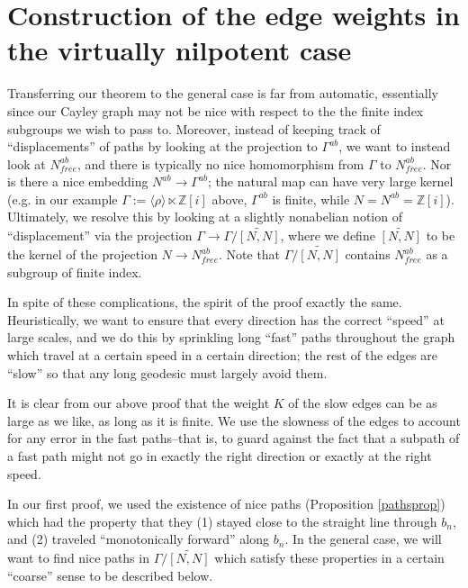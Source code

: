 \documentclass[12pt,reqno]{article}
\numberwithin{equation}{section}
\newcommand{\Z}{\mathbb{Z}}
\begin{document}
\section{Construction of the edge weights in the virtually nilpotent case} \label{generalconstruction}

Transferring our theorem to the general case is far from automatic, essentially since our Cayley graph may not be nice with respect to the 
the finite index subgroups we wish to pass to. Moreover, instead of keeping track of ``displacements'' of paths by looking at the projection to
$\Gamma^{ab}$, we want to instead look at $N^{ab}_{free}$, and there is typically no nice homomorphism from $\Gamma$ to $N^{ab}_{free}$. 
Nor is there a nice embedding $N^{ab} \to \Gamma^{ab}$; the natural map can have very large kernel (e.g. in our example 
$\Gamma := \langle \rho \rangle \ltimes \Z[i]$ above, $\Gamma^{ab}$ is finite, while $N = N^{ab} = \Z[i]$).
Ultimately, we resolve this by looking at a slightly nonabelian notion of ``displacement'' via the projection $\Gamma \to \Gamma/\widetilde{[N,N]}$,
where we define $\widetilde{[N,N]}$ to be the kernel of the projection $N \to N^{ab}_{free}$.
Note that $\Gamma/\widetilde{[N,N]}$ contains $N^{ab}_{free}$ as a subgroup of finite index.

In spite of these complications, the spirit of the proof exactly the same. Heuristically, we want to ensure that
every direction has the correct ``speed'' at large scales, and we do this by sprinkling long ``fast'' paths throughout the graph which travel
at a certain speed in a certain direction; the rest of the edges are ``slow'' so that any long geodesic must largely avoid them.

It is clear from our above proof that the weight $K$ of the slow edges can be as large as we like, as long as it is finite. We use the slowness
of the edges to account for any error in the fast paths--that is, to guard against the fact that a subpath of a fast path might not 
go in exactly the right direction or exactly at the right speed.

In our first proof, we used the existence of nice paths (Proposition \ref{pathsprop}) which had the property that they (1) stayed close
to the straight line through $b_n$, and (2) traveled ``monotonically forward'' along $b_n$. In the general case, we will want to find
nice paths in $\Gamma/\widetilde{[N,N]}$ which satisfy these properties in a certain ``coarse'' sense to be described below.
\end{document}
